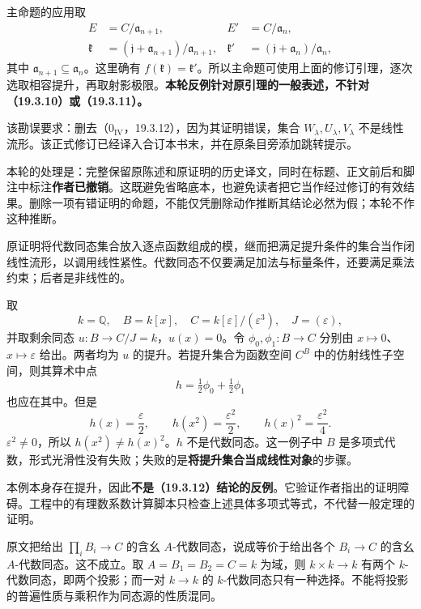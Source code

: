 主命题的应用取
\[
\begin{aligned}
 E&=C/\mathfrak a_{n+1},&
 E'&=C/\mathfrak a_n,\\
 \mathfrak k&=(\mathfrak j+\mathfrak a_{n+1})/\mathfrak a_{n+1},&
 \mathfrak k'&=(\mathfrak j+\mathfrak a_n)/\mathfrak a_n,
\end{aligned}
\]
其中 $\mathfrak a_{n+1}\subseteq\mathfrak a_n$。这里确有 $f(\mathfrak k)=\mathfrak k'$。所以主命题可使用上面的修订引理，逐次选取相容提升，再取射影极限。\textbf{本轮反例针对原引理的一般表述，不针对（19.3.10）或（19.3.11）。}

该勘误要求：删去（$0_{\mathrm{IV}}$，19.3.12），因为其证明错误，集合 $W_\lambda,U_\lambda,V_\lambda$ 不是线性流形。该正式修订已经译入合订本书末，并在原条目旁添加跳转提示。

本轮的处理是：完整保留原陈述和原证明的历史译文，同时在标题、正文前后和脚注中标注\textbf{作者已撤销}。这既避免省略底本，也避免读者把它当作经过修订的有效结果。删除一项有错证明的命题，不能仅凭删除动作推断其结论必然为假；本轮不作这种推断。

原证明将代数同态集合放入逐点函数组成的模，继而把满足提升条件的集合当作闭线性流形，以调用线性紧性。代数同态不仅要满足加法与标量条件，还要满足乘法约束；后者是非线性的。

取
\[
 k=\mathbb Q,\quad B=k[x],\quad
 C=k[\varepsilon]/(\varepsilon^3),\quad J=(\varepsilon),
\]
并取剩余同态 $u:B\to C/J=k$，$u(x)=0$。令 $\phi_0,\phi_1:B\to C$ 分别由 $x\mapsto0$、$x\mapsto\varepsilon$ 给出。两者均为 $u$ 的提升。若提升集合为函数空间 $C^B$ 中的仿射线性子空间，则其算术中点
\[
 h=\tfrac12\phi_0+\tfrac12\phi_1
\]
也应在其中。但是
\[
 h(x)=\frac{\varepsilon}{2},\qquad
 h(x^2)=\frac{\varepsilon^2}{2},\qquad
 h(x)^2=\frac{\varepsilon^2}{4}.
\]
$\varepsilon^2\ne0$，所以 $h(x^2)\ne h(x)^2$。$h$ 不是代数同态。这一例子中 $B$ 是多项式代数，形式光滑性没有失败；失败的是\textbf{将提升集合当成线性对象}的步骤。

本例本身存在提升，因此\textbf{不是（19.3.12）结论的反例}。它验证作者指出的证明障碍。工程中的有理数系数计算脚本只检查上述具体多项式等式，不代替一般定理的证明。

原文把给出 $\prod_iB_i\to C$ 的含幺 $A$-代数同态，说成等价于给出各个 $B_i\to C$ 的含幺 $A$-代数同态。这不成立。取 $A=B_1=B_2=C=k$ 为域，则 $k\times k\to k$ 有两个 $k$-代数同态，即两个投影；而一对 $k\to k$ 的 $k$-代数同态只有一种选择。不能将投影的普遍性质与乘积作为同态源的性质混同。

